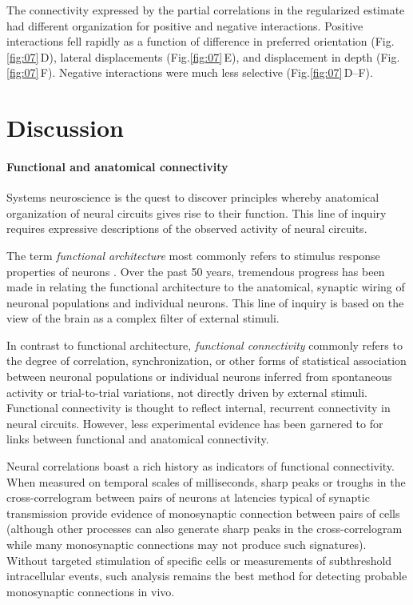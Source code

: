 \documentclass[10pt]{article}
\newcommand{\figref}[2]{Fig.\;\ref{fig:#1}\,#2}
\begin{document}
The connectivity expressed by the partial correlations in the regularized estimate had different organization for positive and negative interactions. Positive interactions fell rapidly as a function of difference in preferred orientation (\figref{07}{D}), lateral displacements (\figref{07}{E}), and displacement in depth (\figref{07}{F}). Negative interactions were much less selective (\figref{07}{D--F}).

\section*{Discussion}
\paragraph{Functional and anatomical connectivity}
Systems neuroscience is the quest to discover principles whereby anatomical organization of neural circuits gives rise to their function.  This line of inquiry requires expressive descriptions of the observed activity of neural circuits. 

The term \emph{functional architecture} most commonly refers to stimulus response properties of neurons \cite{Reid:2012}. Over the past 50 years, tremendous progress has been made in relating the functional architecture to the anatomical, synaptic wiring of neuronal populations and individual neurons.  This line of inquiry is based on the view of the brain as a complex filter of external stimuli. 

In contrast to functional architecture, \emph{functional connectivity} commonly refers to the degree of correlation, synchronization, or other forms of statistical association between neuronal populations or individual neurons inferred from spontaneous activity or trial-to-trial variations,  not directly driven by external stimuli.  Functional connectivity is thought to reflect internal, recurrent connectivity in neural circuits.   However, less experimental evidence has been garnered to for links between functional and anatomical connectivity. 

Neural correlations boast a rich history as indicators of functional connectivity. When measured on temporal scales of milliseconds, sharp peaks or troughs in the cross-correlogram between pairs of neurons at latencies typical of synaptic transmission provide evidence of monosynaptic connection between pairs of cells \cite{Moore:1970, Alonso:1998, Denman:2013} (although other processes can also generate sharp peaks in the cross-correlogram while many monosynaptic connections may not produce such signatures). Without targeted stimulation of specific cells or measurements of subthreshold intracellular events, such analysis remains the best method for detecting probable monosynaptic connections in vivo. 
\end{document}
